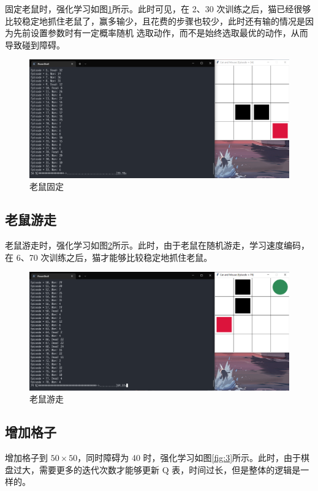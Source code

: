 \documentclass[UTF8, fontset=windows]{ctexart}
\begin{document}
固定老鼠时，强化学习如图\ref{fig:1}所示。此时可见，在 2、30 次训练之后，猫已经很够比较稳定地抓住老鼠了，赢多输少，且花费的步骤也较少，此时还有输的情况是因为先前设置参数时有一定概率随机
选取动作，而不是始终选取最优的动作，从而导致碰到障碍。

\begin{figure}[H]
    \centering
    \includegraphics[width=.8\textwidth]{images/1.png}
    \caption{老鼠固定}
    \label{fig:1}
\end{figure}

\subsection{老鼠游走}

老鼠游走时，强化学习如图\ref{fig:2}所示。此时，由于老鼠在随机游走，学习速度编码，在 6、70 次训练之后，猫才能够比较稳定地抓住老鼠。

\begin{figure}[H]
    \centering
    \includegraphics[width=.8\textwidth]{images/2.png}
    \caption{老鼠游走}
    \label{fig:2}
\end{figure}

\subsection{增加格子}

增加格子到 $50\times 50$，同时障碍为 40 时，强化学习如图\ref{fig:3}所示。此时，由于棋盘过大，需要更多的迭代次数才能够更新 Q 表，时间过长，但是整体的逻辑是一样的。
\end{document}
